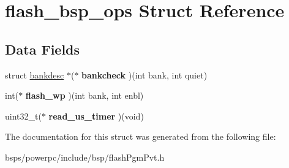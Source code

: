\hypertarget{structflash__bsp__ops}{}\section{flash\+\_\+bsp\+\_\+ops Struct Reference}
\label{structflash__bsp__ops}
\subsection*{Data Fields}
\begin{DoxyCompactItemize}
\item 
\mbox{\label{structflash__bsp__ops_a847e09fd36b8ac2445619d2e17435568}} 
struct \mbox{\hyperlink{structbankdesc}{bankdesc}} $\ast$($\ast$ {\bfseries bankcheck} )(int bank, int quiet)
\item 
\mbox{\label{structflash__bsp__ops_a0ccbc9a8b85f15cdf8d929d91ebbd561}} 
int($\ast$ {\bfseries flash\+\_\+wp} )(int bank, int enbl)
\item 
\mbox{\label{structflash__bsp__ops_af0a4ad431d97e71df4d07f8ff21439e9}} 
uint32\+\_\+t($\ast$ {\bfseries read\+\_\+us\+\_\+timer} )(void)
\end{DoxyCompactItemize}


The documentation for this struct was generated from the following file\+:\begin{DoxyCompactItemize}
\item 
bsps/powerpc/include/bsp/flash\+Pgm\+Pvt.\+h\end{DoxyCompactItemize}
